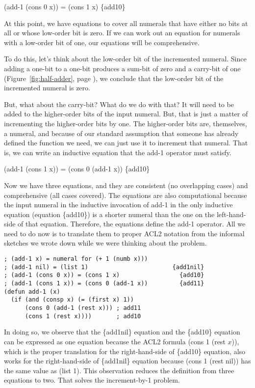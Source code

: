 \hspace{1cm}  (add-1 (cons 0 x)) = (cons 1 x)    \hfill \{add10\}

At this point, we have equations to cover all numerals
that have either no bits at all or whose low-order bit
is zero. If we can work out an equation for numerals
with a low-order bit of one, our equations will be comprehensive.

To do this, let's think about the
low-order bit of the incremented numeral.
Since adding a one-bit to a one-bit produces a sum-bit
of zero and a carry-bit of one
(Figure~\ref{fig:half-adder}, page \pageref{fig:half-adder}),
we conclude that the low-order bit of the incremented numeral
is zero.

But, what about the carry-bit? What do we do with that?
It will need to be added to the higher-order bits of
the input numeral. But, that is just a matter of incrementing
the higher-order bits by one.
The higher-order bits are, themselves, a numeral,
and because of our standard assumption that
someone has already defined the function we need,
we can just use it to increment that numeral.
That is, we can write an inductive equation that the add-1 operator
must satisfy.

\hspace{1cm}  (add-1 (cons 1 x)) = (cons 0 (add-1 x))   \hfill \{add10\}

Now we have three equations, and they are
consistent (no overlapping cases) and
comprehensive (all cases covered).
The equations are also computational because the input numeral in
the inductive invocation of add-1 in the only inductive equation
(equation \{add10\}) is a shorter numeral than
the one on the left-hand-side of that equation.
Therefore, the equations define the add-1 operator.
All we need to do now is to translate them to proper ACL2 notation
from the informal sketches we wrote down
while we were thinking about the problem.

\label{add-1-defun}
\begin{Verbatim}
; (add-1 x) = numeral for (+ 1 (numb x)))
; (add-1 nil) = (list 1)                        {add1nil}
; (add-1 (cons 0 x)) = (cons 1 x)                 {add10}
; (add-1 (cons 1 x)) = (cons 0 (add-1 x))         {add11}
(defun add-1 (x)
  (if (and (consp x) (= (first x) 1))
      (cons 0 (add-1 (rest x))) ; add11
      (cons 1 (rest x))))       ; add10
\end{Verbatim}

In doing so, we observe that the \{add1nil\} equation
and the \{add10\} equation can be expressed as one equation because
the ACL2 formula (cons 1 (rest $x$)), which is the proper
translation for the right-hand-side of \{add10\} equation,
also works for the right-hand-side of \{add1nil\} equation
because (cons 1 (rest nil)) has the same value as (list 1).
This observation reduces the definition from three equations to two.
That solves the increment-by-1 problem.

